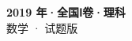 \documentclass[zihao=-4, a4paper]{ctexart}
\begin{document}
\begin{center}
  {\Large\bfseries 2019 年·全国Ⅰ卷·理科}\\[4pt]
  {\large 数学 · 试题版}
\end{center}
\medskip
{}

\end{document}
